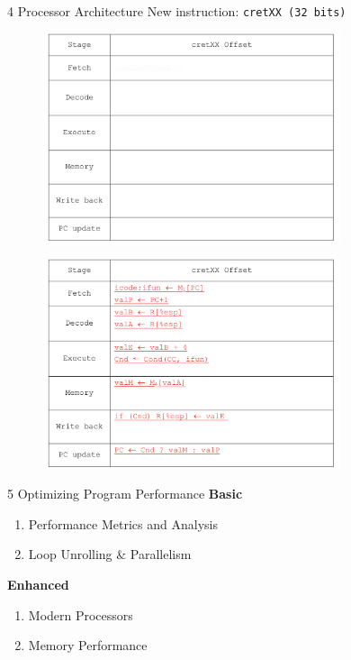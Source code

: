\documentclass{beamer}
\begin{document}
\begin{frame}{4 Processor Architecture}
New instruction: \texttt{cretXX  (32 bits)}
 {
	\begin{figure}
		\centering
		\includegraphics[width=0.78\textwidth]{figures/4-1-1.jpeg}
	\end{figure}
}
 {
	\begin{figure}
		\centering
		\includegraphics[width=0.78\textwidth]{figures/4-1-2.jpeg}
	\end{figure}
}
\end{frame}

\begin{frame}{5 Optimizing Program Performance}
\textbf{Basic}
\begin{enumerate}
	\item Performance Metrics and Analysis
	\item Loop Unrolling \& Parallelism
\end{enumerate}
\textbf{Enhanced}
\begin{enumerate}
	\item Modern Processors
	\item Memory Performance
\end{enumerate}
\end{frame}
\end{document}
